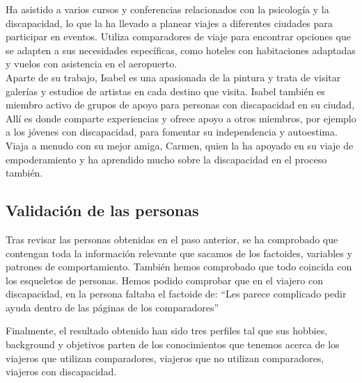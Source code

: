 Ha asistido a varios cursos y conferencias relacionados con la psicología y la discapacidad, lo que la ha llevado a planear viajes a diferentes ciudades para participar en eventos. Utiliza comparadores de viaje para encontrar opciones que se adapten a sus necesidades específicas, como hoteles con habitaciones adaptadas y vuelos con asistencia en el aeropuerto. \\

Aparte de su trabajo, Isabel es una apasionada de la pintura y trata de visitar galerías y estudios de artistas en cada destino que visita. Isabel también es miembro activo de grupos de apoyo para personas con discapacidad en su ciudad, Allí es donde comparte experiencias y ofrece apoyo a otros miembros, por ejemplo a los jóvenes con discapacidad, para fomentar su independencia y autoestima.
Viaja a menudo con su mejor amiga, Carmen, quien la ha apoyado en su viaje de empoderamiento y ha aprendido mucho sobre la discapacidad en el proceso también.

\subsection{Validación de las personas}
Tras revisar las personas obtenidas en el paso anterior, se ha
comprobado que contengan toda la información relevante que sacamos de los factoides,
variables y patrones de comportamiento. También hemos comprobado que todo coincida con los esqueletos de personas. Hemos podido comprobar que en el viajero con discapacidad, en la persona faltaba el factoide de: “Les parece complicado pedir ayuda dentro de las páginas de los comparadores”

Finalmente, el resultado obtenido han sido tres perfiles tal que sus hobbies, background y
objetivos parten de los conocimientos que tenemos acerca de los viajeros que utilizan comparadores, viajeros que no utilizan comparadores, viajeros con discapacidad.

